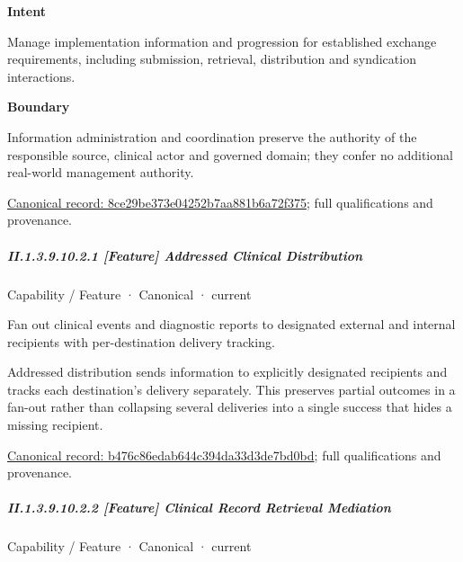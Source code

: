 \textbf{Intent}



Manage implementation information and progression for established exchange requirements, including submission, retrieval, distribution and syndication interactions.



\textbf{Boundary}



Information administration and coordination preserve the authority of the responsible source, clinical actor and governed domain; they confer no additional real-world management authority.


{\footnotesize \href{../../../../continuum/strategy/capability/8ce29be373e04252b7aa881b6a72f375.md}{Canonical record: 8ce29be373e04252b7aa881b6a72f375}; full qualifications and provenance.}\par
\subparagraph*{II.1.3.9.10.2.1 [Feature] Addressed Clinical Distribution}
\label{navigation:II.1.3.9.10.2.1}

\label{element:b476c86edab644c394da33d3de7bd0bd}
{\small Capability / Feature · Canonical · current}\par

Fan out clinical events and diagnostic reports to designated external and internal recipients with per-destination delivery tracking.



Addressed distribution sends information to explicitly designated recipients and tracks each destination's delivery separately. This preserves partial outcomes in a fan-out rather than collapsing several deliveries into a single success that hides a missing recipient.


{\footnotesize \href{../../../../continuum/strategy/capability/feature/b476c86edab644c394da33d3de7bd0bd.md}{Canonical record: b476c86edab644c394da33d3de7bd0bd}; full qualifications and provenance.}\par
\subparagraph*{II.1.3.9.10.2.2 [Feature] Clinical Record Retrieval Mediation}
\label{navigation:II.1.3.9.10.2.2}

\label{element:6f4a9c8f7916488bb0dd838ccccb1df4}
{\small Capability / Feature · Canonical · current}\par

